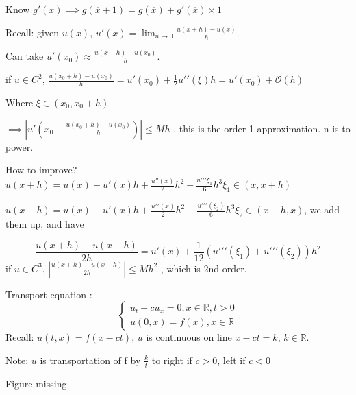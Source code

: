\documentclass[a4paper]{article}
\theoremstyle{definition}
\begin{document}
Know $g'\left( x \right) \implies g\left( \overline{x}+1 \right) =g\left( \overline{x} \right) +g'\left( \overline{x} \right) \times 1$

Recall: given $u\left( x \right) $, $u'\left( x \right) = \lim_{n \to 0} \frac{u\left( x+h \right) -u\left( x \right) }{h}$. 

Can take $u'\left( x_0 \right) \approx \frac{u\left( x+h \right) -u\left( x_0 \right) }{h}$. 

if $u\in C^2$, $\frac{u\left( x_0+h \right) -u\left( x_0 \right) }{h}=u'\left( x_0 \right) +\frac{1}{2}u\prime \prime\left( \xi \right) h=u'\left( x_0 \right) +\mathcal{O}\left( h \right) $ 

Where $\xi \in \left( x_0, x_0+h \right) $

$\implies \left| u'\left( x_0-\frac{u\left( x_0+h \right) -u\left( x_0 \right) }{h} \right)  \right| \le Mh$ , this is the order 1 approximation. n is to power. 

How to improve? 
$u\left( x+h \right) =u\left( x \right) +u'\left( x \right) h+\frac{u''\left( x \right) }{2}h^2+\frac{u\prime\prime\prime \xi_1}{6}h^3 \xi_1\in \left( x,x+h \right) $

$u\left( x-h \right) =u\left( x \right) -u'\left( x \right) h+\frac{u\prime\prime \left( x \right) }{2 }h^2-\frac{u\prime\prime\prime\left( \xi_2 \right) }{6}h^3 \xi_2\in \left( x-h,x \right) $, we add them up, and have 

\begin{equation}
	\frac{u\left( x+h \right) -u\left( x-h \right) }{2h}=u'\left( x \right) +\frac{1}{12}\left( u\prime\prime\prime\left( \xi_1 \right) +u\prime\prime\prime\left( \xi_2 \right)  \right) h^2
\end{equation} 
if $u\in C^3$, $\left| \frac{u\left( x+h \right) -u\left( x-h \right) }{2h} \right| \le Mh^2$ , which is 2nd order. 

Transport equation :
\begin{equation}
	\begin{cases}
		u_t+cu_x=0,x\in \mathbb{R}, t>0\\
		u\left( 0,x \right) =f\left( x \right) , x\in \mathbb{R}
	\end{cases}
\end{equation} 
Recall: $u\left( t,x \right) =f\left( x-ct \right) $, $u$ is continuous on line $x-ct=k$, $k\in \mathbb{R}$. 

Note: $u$ is transportation of f by $\frac{k}{t} $ to right if $c>0$, left if $c<0$

Figure missing 
\end{document}
